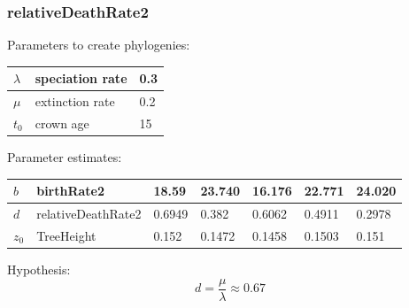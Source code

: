 \documentclass{beamer}
\begin{document}
\begin{frame}
  \frametitle{relativeDeathRate2}

  Parameters to create phylogenies:

  \begin{table}
    \centering
    \begin{tabular}{ | l | l | l | }
      \hline
      $\lambda$ & speciation rate & 0.3 \\
      \hline
      $\mu$ & extinction rate & 0.2 \\
      \hline
      $t_0$ & crown age & 15 \\
      \hline
    \end{tabular}
  \end{table}

  Parameter estimates:

  \begin{table}
    \begin{tabular}{ | l | l | l | l | l | l | l | }
      \hline
      $b$ & birthRate2         & 18.59  & 23.740 & 16.176 & 22.771 & 24.020 \\
      \hline
      $d$ & relativeDeathRate2 & 0.6949 & 0.382  & 0.6062 & 0.4911 & 0.2978 \\
      \hline
      $z_0$ & TreeHeight         & 0.152  & 0.1472 & 0.1458 & 0.1503 & 0.151  \\
      \hline
    \end{tabular}
  \end{table}

  Hypothesis:
  \begin{displaymath} 
    d = \frac{\mu}{\lambda} \approx 0.67 
  \end{displaymath}

\end{frame}
\end{document}
